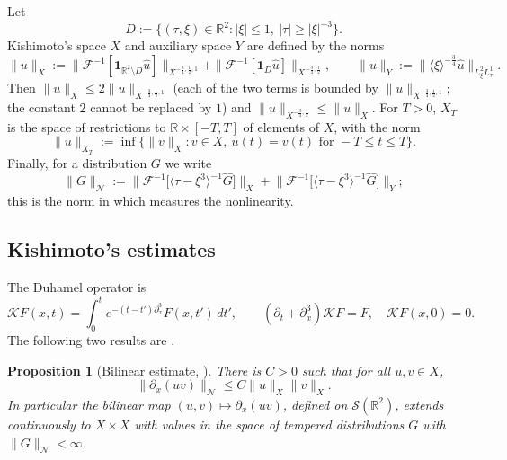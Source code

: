 \documentclass[10pt,reqno]{amsart}
\newtheorem{proposition}[theorem]{Proposition}
\theoremstyle{remark}
\numberwithin{equation}{section}
\newcommand{\R}{\mathbb R}
\newcommand{\pd}{\partial}
\newcommand{\lan}{\langle}
\newcommand{\ran}{\rangle}
\newcommand{\Kc}{\mathcal{K}}
\newcommand{\F}{\mathcal{F}}
\begin{document}
Let
\begin{equation}\label{eq:D}
D := \{ (\tau, \xi) \in \mathbb{R}^2 : |\xi| \leq 1,\ |\tau| \geq |\xi|^{-3} \}.
\end{equation}
Kishimoto's space $X$ and auxiliary space $Y$ are defined by the norms
\begin{equation}\label{eq:X}
\|u\|_X := \| \mathcal{F}^{-1} [\mathbf{1}_{\mathbb{R}^2 \setminus D} \hat{u}] \|_{X^{-\frac{3}{4}, \frac{1}{2}, 1}} + \| \mathcal{F}^{-1} [\mathbf{1}_D \hat{u}] \|_{X^{-\frac{3}{4}, \frac{1}{2}}},\qquad
\|u\|_Y:=\|\lan\xi\ran^{-\frac34}\widehat u\|_{L^2_\xi L^1_\tau}.
\end{equation}
Then $\|u\|_X\le 2\|u\|_{X^{-\frac34,\frac12,1}}$ (each of the two terms is bounded by $\|u\|_{X^{-\frac34,\frac12,1}}$; the constant $2$ cannot be replaced by $1$) and $\|u\|_{X^{-\frac34,\frac12}}\le\|u\|_X$. For $T>0$, $X_T$ is the space of restrictions to $\R\times[-T,T]$ of elements of $X$, with the norm
\begin{equation}\label{eq:XT}
\|u\|_{X_T} := \inf \{ \|v\|_X : v \in X,\ u(t) = v(t) \text{ for } -T \leq t \leq T \}.
\end{equation}
Finally, for a distribution $G$ we write
\begin{equation}\label{eq:Nnorm}
\|G\|_{\mathcal N}:=\big\|\F^{-1}\big[\lan\tau-\xi^3\ran^{-1}\widehat G\big]\big\|_X+\big\|\F^{-1}\big[\lan\tau-\xi^3\ran^{-1}\widehat G\big]\big\|_Y ;
\end{equation}
this is the norm in which \cite{Kishimoto} measures the nonlinearity.

\subsection{Kishimoto's estimates}
The Duhamel operator is
$$\Kc F(x,t)=\int_0^t e^{-(t-t')\pd_x^3}F(x,t')\,dt',\qquad (\pd_t+\pd_x^3)\Kc F=F,\quad \Kc F(x,0)=0 .$$
The following two results are \cite[Proposition 1.1 and Lemma 4.1]{Kishimoto}.

\begin{proposition}[Bilinear estimate, \cite{Kishimoto}]\label{prop:kishimoto}
There is $C>0$ such that for all $u,v\in X$,
$$\|\pd_x(uv)\|_{\mathcal N}\le C\|u\|_X\|v\|_X .$$
In particular the bilinear map $(u,v)\mapsto\pd_x(uv)$, defined on $\mathcal S(\R^2)$, extends continuously to $X\times X$ with values in the space of tempered distributions $G$ with $\|G\|_{\mathcal N}<\infty$.
\end{proposition}
\end{document}
